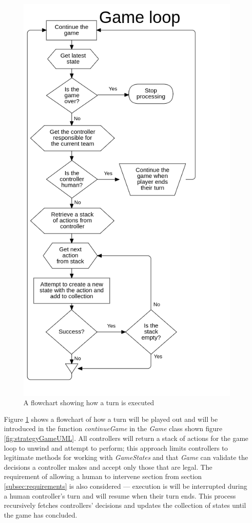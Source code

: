 \documentclass[11pt, a4paper]{report}
\begin{document}
\begin{figure}[!h]
  \centering
  \includegraphics[width=12cm]{img/game_loop.png}
  \caption{A flowchart showing how a turn is executed}
  \label{fig:gameLoop}
\end{figure}

Figure \ref{fig:gameLoop} shows a flowchart of how a turn will be played out and will be introduced in the function \emph{continueGame} in the \emph{Game} class shown figure \ref{fig:strategyGameUML}. All controllers will return a stack of actions for the game loop to unwind and attempt to perform; this approach limits controllers to legitimate methods for working with \emph{GameStates} and that \emph{Game} can validate the decisions a controller makes and accept only those that are legal. The requirement of allowing a human to intervene section from section \ref{subsec:requirements} is also considered --- execution is will be interrupted during a human controller's turn and will resume when their turn ends. This process recursively fetches controllers' decisions and updates the collection of states until the game has concluded.
\end{document}
